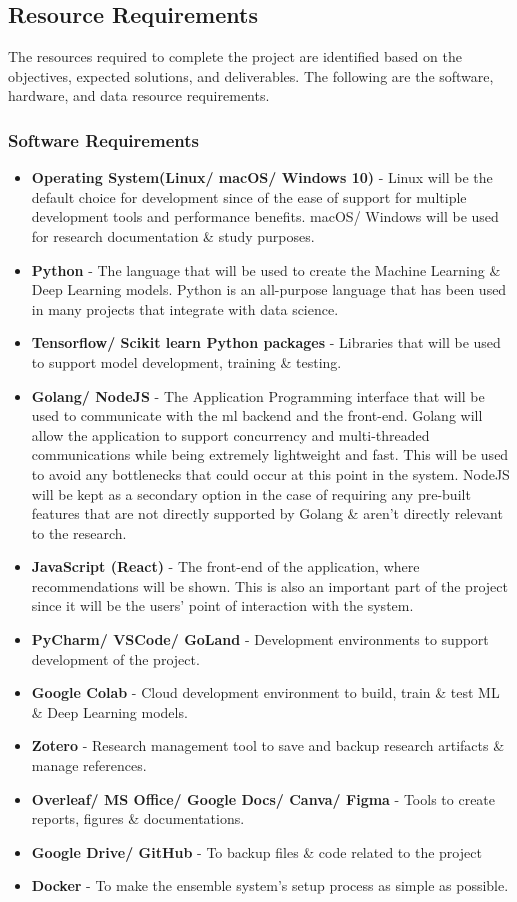 \documentclass[a4paper, 12pt, oneside]{report}
\begin{document}
\subsection{Resource Requirements}
The resources required to complete the project are identified based on the objectives, expected solutions, and deliverables. The following are the software, hardware, and data resource requirements.

\subsubsection{Software Requirements}
\begin{itemize}
\item \textbf{Operating System(Linux/ macOS/ Windows 10)} - Linux will be the default choice for development since of the ease of support for multiple development tools and performance benefits. macOS/ Windows will be used for research documentation \& study purposes.
\item \textbf{Python} - The language that will be used to create the Machine Learning \& Deep Learning models. Python is an all-purpose language that has been used in many projects that integrate with data science.
\item \textbf{Tensorflow/ Scikit learn Python packages} - Libraries that will be used to support model development, training \& testing.
\item \textbf{Golang/ NodeJS} - The Application Programming interface that will be used to communicate with the \Gls{ml} backend and the front-end. Golang will allow the application to support concurrency and multi-threaded communications while being extremely lightweight and fast. This will be used to avoid any bottlenecks that could occur at this point in the system. NodeJS will be kept as a secondary option in the case of requiring any pre-built features that are not directly supported by Golang \& aren't directly relevant to the research.
\item \textbf{JavaScript (React)} - The front-end of the application, where recommendations will be shown. This is also an important part of the project since it will be the users' point of interaction with the system.
\item \textbf{PyCharm/ VSCode/ GoLand} - Development environments to support development of the project.
\item \textbf{Google Colab} - Cloud development environment to build, train \& test ML \& Deep Learning models.
\item \textbf{Zotero} - Research management tool to save and backup research artifacts \& manage references.
\item \textbf{Overleaf/ MS Office/ Google Docs/ Canva/ Figma} - Tools to create reports, figures \& documentations.
\item \textbf{Google Drive/ GitHub} - To backup files \& code related to the project
\item \textbf{Docker} - To make the ensemble system's setup process as simple as possible.
\end{itemize}
\end{document}

